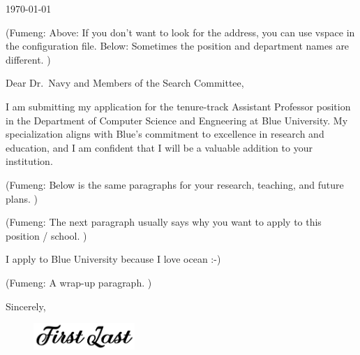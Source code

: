 \documentclass{article}
\newcommand{\Dr}[1]{Dr.~#1}
\newcommand{\fy}[1]{(Fumeng: #1)}
\begin{document}
\makeheader
\makefooter


\mainfont\fontsize{9pt}{9pt}\selectfont

\linespread{1.5} 
\setlength{\parskip}{4pt}

\vspace{1.75em}

 \today
 
 \vspace{1.75em}



\vspace{2.2em}


\fy{Above: If you don't want to look for the address, you can use vspace in the configuration file. Below: Sometimes the position and department names are different. } 

Dear \Dr{Navy} and Members of the Search Committee,

I am submitting my application for
the tenure-track Assistant Professor position in the Department of Computer Science and Engneering at Blue University.
My specialization aligns with 
Blue's commitment to excellence in research and education,
and I am confident that I will be a valuable addition to your institution.

\fy{Below is the same paragraphs for your research, teaching, and future plans. }

\lipsum[4-5]

\fy{The next paragraph usually says why you want to apply to this position / school. }

I apply to Blue University because I love ocean :-)

\fy{A wrap-up paragraph. }

\lipsum[6]













\vspace{4em}

Sincerely,
\begin{figure}[h]
	\includegraphics[height=1cm]{../fig/sign.png}
	\vspace*{-10pt}
\end{figure}

\mynamePhD
\end{document}
